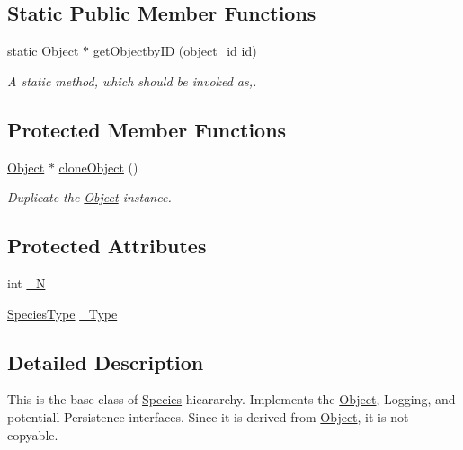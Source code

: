 \subsection*{Static Public Member Functions}
\begin{DoxyCompactItemize}
\item 
static \hyperlink{classObject}{Object} $\ast$ \hyperlink{classObject_a0fcfbdfa4439b322c375a5f99c3dfabd}{get\-Objectby\-I\-D} (\hyperlink{Object_8h_a0b56ddf6ace42572542aae1f2c364e05}{object\-\_\-id} id)
\begin{DoxyCompactList}\small\item\em A static method, which should be invoked as,. \end{DoxyCompactList}\end{DoxyCompactItemize}
\subsection*{Protected Member Functions}
\begin{DoxyCompactItemize}
\item 
\hyperlink{classObject}{Object} $\ast$ \hyperlink{classObject_a11a1dd53ef68fc4a1ad8c6175132c8d5}{clone\-Object} ()
\begin{DoxyCompactList}\small\item\em Duplicate the \hyperlink{classObject}{Object} instance. \end{DoxyCompactList}\end{DoxyCompactItemize}
\subsection*{Protected Attributes}
\begin{DoxyCompactItemize}
\item 
int \hyperlink{classSpecies_aaf64f0a20dc213a6f03c69e7c3caa43a}{\-\_\-\-N}
\item 
\hyperlink{Species_8h_af8f3afcc030f67a124aa4a6b5badf495}{Species\-Type} \hyperlink{classSpecies_ae80ccbaa2b115cea250b7f87ce517105}{\-\_\-\-Type}
\end{DoxyCompactItemize}


\subsection{Detailed Description}
This is the base class of \hyperlink{classSpecies}{Species} hieararchy. Implements the \hyperlink{classObject}{Object}, Logging, and potentiall Persistence interfaces. Since it is derived from \hyperlink{classObject}{Object}, it is not copyable. 

